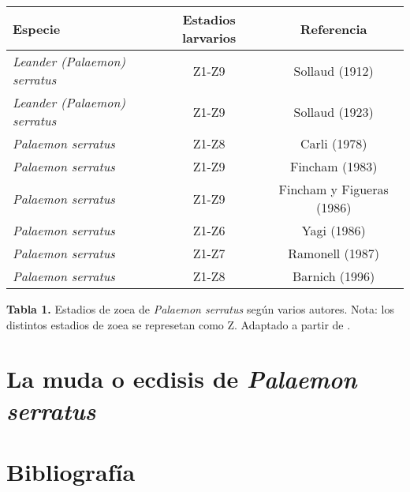 \documentclass[a4paper]{article}
\begin{document}
\begin{adjustbox}{max width=\textwidth}
\begin{tabular}{|l|c|c|}
\hline 
Especie & Estadios larvarios & Referencia\\
\hline
\textit{Leander (Palaemon) serratus} & Z1-Z9 & Sollaud (1912)\\
\hline
\textit{Leander (Palaemon) serratus} & Z1-Z9 & Sollaud (1923)\\
\hline
\textit{Palaemon serratus} & Z1-Z8 & Carli (1978)\\
\hline
\textit{Palaemon serratus} & Z1-Z9 & Fincham (1983)\\
\hline
\textit{Palaemon serratus} & Z1-Z9 & Fincham y Figueras (1986)\\
\hline
\textit{Palaemon serratus} & Z1-Z6 & Yagi (1986)\\
\hline
\textit{Palaemon serratus} & Z1-Z7 & Ramonell (1987)\\
\hline
\textit{Palaemon serratus} & Z1-Z8 & Barnich (1996)\\
\hline
\end{tabular}
\end{adjustbox}

\textbf{Tabla 1.} Estadios de zoea de \textit{Palaemon serratus} según varios autores. Nota: los distintos estadios de zoea se represetan como Z. Adaptado a partir de \citep{Gonzalez2001}.\par

\section{La muda o ecdisis de \textit{Palaemon serratus}}

\section{Bibliografía}

\end{document}
